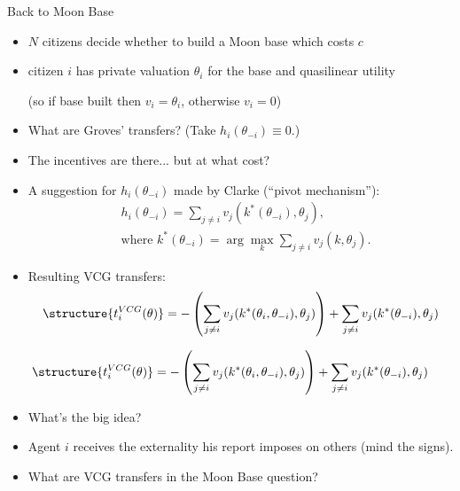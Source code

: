\documentclass[english,handout,10pt]{beamer}		%
\def\lyxframeend{} %
\begin{document}
\begin{exampleblock}{Back to Moon Base}
	\begin{itemize}
		\item $N$ citizens decide whether to build a Moon base which costs $c$
		\item citizen $i$ has private valuation $\theta_{i}$ for the base and quasilinear utility
		
		(so if base built then $v_i = \theta_i$, otherwise $v_i = 0$)
	\end{itemize}
\end{exampleblock}
\begin{itemize}
	\item What are Groves' transfers{\tiny\texttrademark}? (Take $h_i(\theta_{-i}) \equiv 0$.)
	\pause
	\item The incentives are there... but at what cost?
\end{itemize}
\lyxframeend


\begin{itemize}
	\item A suggestion for $h_i(\theta_{-i})$ made by Clarke (``pivot mechanism''):
	\vspace{-0.5em}\begin{align*}
	&h_{i}(\theta_{-i})=\sum_{j\neq i} v_{j}(k^*(\theta_{-i}),\theta_{j}),
	\\ &\text{where } k^*(\theta_{-i}) = \arg\max_{k} \sum_{j\neq i}v_{j}(k,\theta_{j}).
	\end{align*}
	\pause
	\item Resulting \alert{VCG transfers}:
	\vspace{-0.5em}\begin{align*}
	\structure{ t_{i}^{VCG}(\theta) } = -\left(\sum_{j\neq i} v_{j}(k^*(\theta_i, \theta_{-i}), \theta_{j}) \right) + \sum_{j\neq i} v_{j}(k^*(\theta_{-i}), \theta_{j})
	\end{align*}
\end{itemize}
\lyxframeend


\begin{align*}
\structure{ t_{i}^{VCG}(\theta) } = -\left(\sum_{j\neq i} v_{j}(k^*(\theta_i, \theta_{-i}), \theta_{j}) \right) + \sum_{j\neq i} v_{j}(k^*(\theta_{-i}), \theta_{j})
\end{align*}
\begin{itemize}
	\item What's the big idea?
	\item Agent $i$ receives the externality his report imposes on others (mind the signs).
	\item What are VCG transfers in the Moon Base question?
\end{itemize}
\lyxframeend
\end{document}
